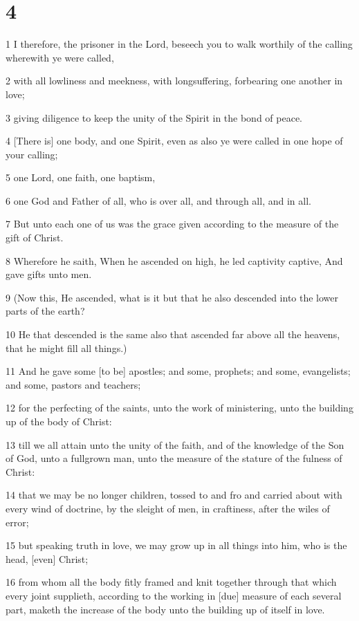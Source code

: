\chapter{4}

\par 1 I therefore, the prisoner in the Lord, beseech you to walk worthily of the calling wherewith ye were called,
\par 2 with all lowliness and meekness, with longsuffering, forbearing one another in love;
\par 3 giving diligence to keep the unity of the Spirit in the bond of peace.
\par 4 [There is] one body, and one Spirit, even as also ye were called in one hope of your calling;
\par 5 one Lord, one faith, one baptism,
\par 6 one God and Father of all, who is over all, and through all, and in all.
\par 7 But unto each one of us was the grace given according to the measure of the gift of Christ.
\par 8 Wherefore he saith, When he ascended on high, he led captivity captive, And gave gifts unto men.
\par 9 (Now this, He ascended, what is it but that he also descended into the lower parts of the earth?
\par 10 He that descended is the same also that ascended far above all the heavens, that he might fill all things.)
\par 11 And he gave some [to be] apostles; and some, prophets; and some, evangelists; and some, pastors and teachers;
\par 12 for the perfecting of the saints, unto the work of ministering, unto the building up of the body of Christ:
\par 13 till we all attain unto the unity of the faith, and of the knowledge of the Son of God, unto a fullgrown man, unto the measure of the stature of the fulness of Christ:
\par 14 that we may be no longer children, tossed to and fro and carried about with every wind of doctrine, by the sleight of men, in craftiness, after the wiles of error;
\par 15 but speaking truth in love, we may grow up in all things into him, who is the head, [even] Christ;
\par 16 from whom all the body fitly framed and knit together through that which every joint supplieth, according to the working in [due] measure of each several part, maketh the increase of the body unto the building up of itself in love.
